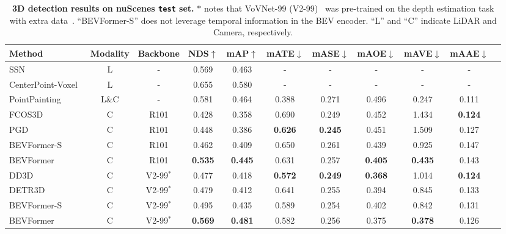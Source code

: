 \documentclass{article}
\begin{document}
\begin{table}[t]
\begin{center}
\caption{
\textbf{3D detection results on nuScenes \texttt{test} set.} $*$ notes that VoVNet-99 (V2-99)~\cite{lee2019energy} was pre-trained on the depth estimation task with extra data~\cite{park2021pseudo}. ``BEVFormer-S'' does not leverage temporal information in the BEV encoder. ``L'' and ``C'' indicate LiDAR and Camera, respectively.
}

\setlength{\tabcolsep}{0.28mm}
\begin{tabular}{l  c c |c c| c c c c c c }
\toprule
Method &  Modality & Backbone & NDS$\uparrow$  & mAP$\uparrow$  & mATE$\downarrow$     & mASE$\downarrow$     & mAOE$\downarrow$     & mAVE$\downarrow$    & mAAE$\downarrow$    \\
\midrule

SSN~\cite{zhu2020ssn} &L &-& 0.569 &0.463 &-&-&-&-&-\\
CenterPoint-Voxel~\cite{yin2021center} & L &-& 0.655 & 0.580  & - &- &- &- &- \\
PointPainting~\cite{vora2020pointpainting}& L$\!\&\!$C&-&0.581 &0.464 &0.388&0.271&0.496&0.247&0.111\\
\midrule

FCOS3D~\cite{wang2021fcos3d}  & C  & R101& 0.428 &0.358& 0.690& 0.249& 0.452& 1.434 &\textbf{0.124} \\
PGD~\cite{wang2022probabilistic}  & C &  R101&0.448 &0.386& \textbf{0.626}& \textbf{0.245} &0.451 &1.509 &0.127 \\
\rowcolor{gray95}
BEVFormer-S    & C & R101& 0.462& 0.409 & 0.650 & 0.261 & 0.439 & 0.925 & 0.147 \\
\rowcolor{gray9}
BEVFormer    & C & R101& \textbf{0.535}& \textbf{0.445} & 0.631 & 0.257 & \textbf{0.405} & \textbf{0.435} & 0.143 \\
\midrule
DD3D~\cite{park2021pseudo}  & C &V2-99$^*$& 0.477 &0.418& \textbf{0.572} & \textbf{0.249} &\textbf{0.368} &1.014 &\textbf{0.124} \\

DETR3D~\cite{wang2022detr3d}  & C &  V2-99$^*$& 0.479 & 0.412 &0.641& 0.255 &0.394 &0.845& 0.133\\
\rowcolor{gray95}
BEVFormer-S& C &V2-99$^*$ & 0.495& 0.435 & 0.589&0.254 & 0.402 &0.842 & 0.131 \\
\rowcolor{gray9}
BEVFormer& C &V2-99$^*$ & \textbf{0.569}& \textbf{0.481} & 0.582&0.256 & 0.375 & \textbf{0.378} & 0.126 \\

\bottomrule
\end{tabular} \label{main_det}
\end{center}
\end{table}
\end{document}
